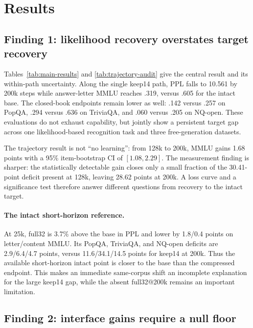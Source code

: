 \section{Results}
\label{sec:experiments}

\subsection{Finding 1: likelihood recovery overstates target recovery}



Tables~\ref{tab:main-results} and \ref{tab:trajectory-audit} give the central
result and its within-path uncertainty.
Along the single keep14 path, PPL falls to 10.561 by 200k steps while
answer-letter MMLU reaches .319, versus .605 for the intact base. The
closed-book endpoints remain lower as well: .142 versus .257 on PopQA, .294
versus .636 on TriviaQA, and .060 versus .205 on NQ-open. These evaluations do
not exhaust capability, but jointly show a persistent target gap across one
likelihood-based recognition task and three free-generation datasets.

The trajectory result is not ``no learning'': from 128k to 200k, MMLU gains
1.68 points with a 95\% item-bootstrap CI of $[1.08,2.29]$. The measurement
finding is sharper: the statistically detectable gain closes only a small
fraction of the 30.41-point deficit present at 128k, leaving 28.62 points at
200k. A loss curve and a significance test therefore answer different
questions from recovery to the intact target.

\paragraph{The intact short-horizon reference.}
At 25k, full32 is 3.7\% above the base in PPL and lower by 1.8/0.4 points on
letter/content MMLU. Its PopQA, TriviaQA, and NQ-open deficits are
2.9/6.4/4.7 points, versus 11.6/34.1/14.5 points for keep14 at 200k. Thus the
available short-horizon intact point is closer to the base than the compressed
endpoint. This makes an immediate same-corpus shift an incomplete explanation
for the large keep14 gap, while the absent full32@200k remains an important
limitation.

\subsection{Finding 2: interface gains require a null floor}


